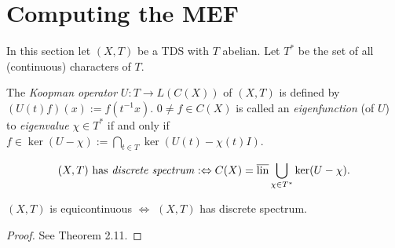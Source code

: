 \section{Computing the MEF}
In this section let $(X,T)$ be a TDS with $T$ abelian.
Let $T^*$ be the set of all (continuous) characters of $T$.
\begin{definition}
  The \emph{Koopman operator} $U : T \to L(C(X))$ of $(X,T)$ is defined by $(U(t) f)(x) := f(t^{-1}x)$.
  $0 \neq f \in C(X)$ is called an \emph{eigenfunction} (of $U$) to \emph{eigenvalue} $\chi \in T^*$ if and only if $f \in \ker (U-\chi):= \bigcap_{t \in T} \ker (U(t)- \chi (t)I)$.
\end{definition}
\begin{definition}
  \begin{equation*}
    (X,T) \ \text{has \emph{discrete spectrum}}:\Leftrightarrow C(X) = \overline{\operatorname{lin}} \bigcup_{\chi \in T^*} \ker (U- \chi).
  \end{equation*}
\end{definition}
\begin{theorem}
  \label{mef:thm:equiEQdiscrete}
  $(X,T)$ is equicontinuous $\Leftrightarrow$ $(X,T)$ has discrete spectrum.
\end{theorem}
\begin{proof}
  See \cite{HK2023} Theorem 2.11.
\end{proof}

